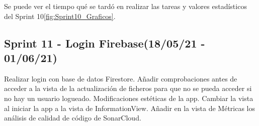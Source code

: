 Se puede ver el tiempo qué se tardó en realizar las tareas y valores estadísticos del Sprint 10\ref{fig:Sprint10_Graficos}.



\subsection{Sprint 11 - Login Firebase(18/05/21 - 01/06/21)}
Realizar login con base de datos Firestore. Añadir comprobaciones antes de acceder a la vista de la actualización de ficheros para que no se pueda acceder si no hay un usuario logueado. Modificaciones estéticas de la app. Cambiar la vista al iniciar la app a la vista de InformationView. Añadir en la vista de Métricas los análisis de calidad de código de SonarCloud.

